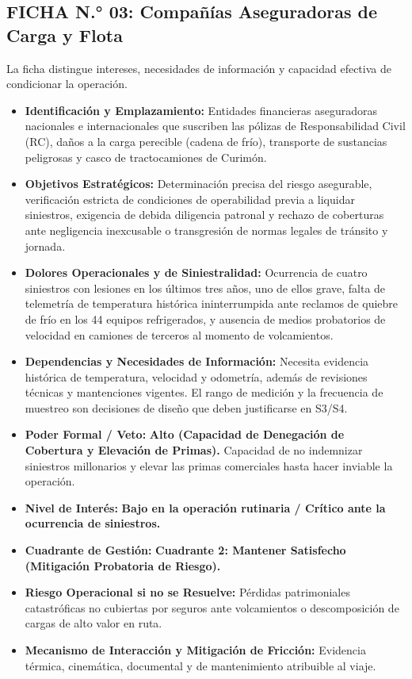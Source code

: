 \subsection*{FICHA N.° 03: Compañías Aseguradoras de Carga y Flota}
La ficha distingue intereses, necesidades de información y capacidad efectiva de condicionar la operación.
\begin{itemize}
\item \textbf{Identificación y Emplazamiento:} Entidades financieras aseguradoras nacionales e internacionales que suscriben las pólizas de Responsabilidad Civil (RC), daños a la carga perecible (cadena de frío), transporte de sustancias peligrosas y casco de tractocamiones de Curimón.
\item \textbf{Objetivos Estratégicos:} Determinación precisa del riesgo asegurable, verificación estricta de condiciones de operabilidad previa a liquidar siniestros, exigencia de debida diligencia patronal y rechazo de coberturas ante negligencia inexcusable o transgresión de normas legales de tránsito y jornada.
\item \textbf{Dolores Operacionales y de Siniestralidad:} Ocurrencia de cuatro siniestros con lesiones en los últimos tres años, uno de ellos grave, falta de telemetría de temperatura histórica ininterrumpida ante reclamos de quiebre de frío en los 44 equipos refrigerados, y ausencia de medios probatorios de velocidad en camiones de terceros al momento de volcamientos.
\item \textbf{Dependencias y Necesidades de Información:} Necesita evidencia histórica de temperatura, velocidad y odometría, además de revisiones técnicas y mantenciones vigentes. El rango de medición y la frecuencia de muestreo son decisiones de diseño que deben justificarse en S3/S4.
\item \textbf{Poder Formal / Veto:} \textbf{Alto (Capacidad de Denegación de Cobertura y Elevación de Primas).} Capacidad de no indemnizar siniestros millonarios y elevar las primas comerciales hasta hacer inviable la operación.
\item \textbf{Nivel de Interés:} \textbf{Bajo en la operación rutinaria / Crítico ante la ocurrencia de siniestros.}
\item \textbf{Cuadrante de Gestión:} \textbf{Cuadrante 2: Mantener Satisfecho (Mitigación Probatoria de Riesgo).}
\item \textbf{Riesgo Operacional si no se Resuelve:} Pérdidas patrimoniales catastróficas no cubiertas por seguros ante volcamientos o descomposición de cargas de alto valor en ruta.
\item \textbf{Mecanismo de Interacción y Mitigación de Fricción:} Evidencia térmica, cinemática, documental y de mantenimiento atribuible al viaje.
\end{itemize}
